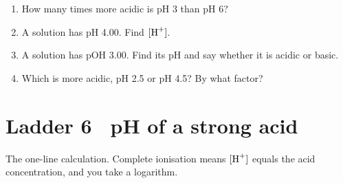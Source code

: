 \documentclass{apchem-worksheet}
\begin{document}
\begin{yourturn}
\begin{enumerate}[leftmargin=*,itemsep=0.5em]
  \item How many times more acidic is pH 3 than pH 6?
        \workspace[1.6cm]
  \item A solution has pH 4.00. Find $[\ce{H+}]$.
        \workspace[1.6cm]
  \item A solution has pOH 3.00. Find its pH and say whether it is
        acidic or basic. \workspace[1.8cm]
  \item Which is more acidic, pH 2.5 or pH 4.5? By what factor?
        \workspace[1.8cm]
\end{enumerate}
\end{yourturn}

\section*{\sffamily Ladder 6 \textbullet\ pH of a strong acid}

The one-line calculation. Complete ionisation means $[\ce{H+}]$ equals
the acid concentration, and you take a logarithm.
\end{document}
